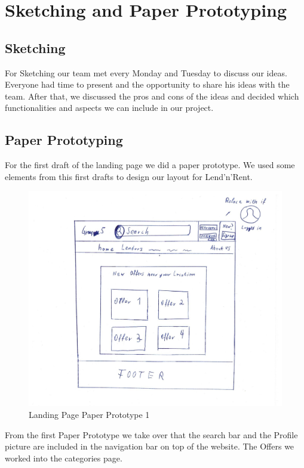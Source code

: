\section{Sketching and Paper Prototyping}

    \subsection{Sketching}
        For Sketching our team met every Monday and Tuesday to discuss our ideas. Everyone had time to present and the opportunity to share his ideas with the team. After that, we discussed the pros and cons of the ideas and decided which functionalities and aspects we can include in our project.
        
    \subsection{Paper Prototyping}
        For the first draft of the landing page we did a paper prototype. We used some elements from this first drafts to design our layout for Lend'n'Rent.
        
        	\begin{figure}[H]
				\centering
				\includegraphics[width=\linewidth]{abb/6_Sketching and Paper Prototyping/Homepage1.png}
				\caption{Landing Page Paper Prototype 1}
				\label{fig:Homepage1}
			\end{figure}
			
			\noindent
			From the first Paper Prototype we take over that the search bar and the Profile picture are included in the navigation bar on top of the website. The Offers we worked into the categories page. 
			
